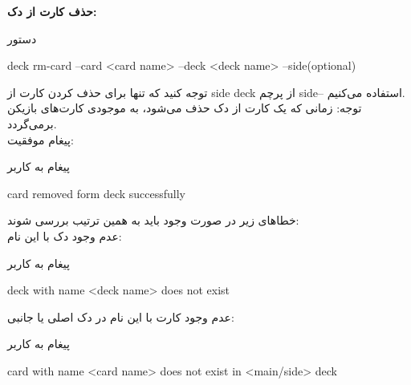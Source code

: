 \documentclass[]{article}
\begin{document}
\vspace{.5cm}
\textbf{حذف کارت از دک:}
\begin{mybox}[colback=yellow]{دستور}
	\begin{latin}	
		deck rm-card --card <card name> --deck <deck name> --side(optional)
	\end{latin}
\end{mybox}
توجه کنید که تنها برای حذف کردن کارت از side deck از پرچم side-- استفاده 
می‌کنیم.
\\
توجه: زمانی که یک کارت از دک حذف می‌شود، به موجودی کارت‌های بازیکن برمی‌گردد.
\\
پیغام موفقیت:
\begin{mybox}[colback=yellow]{پیغام به کاربر}
	\begin{latin}	
		card removed form deck successfully
	\end{latin}
\end{mybox}
خطاهای زیر در صورت وجود باید به همین ترتیب بررسی شوند:
\\
عدم وجود دک با این نام:
\begin{mybox}[colback=yellow]{پیغام به کاربر}
	\begin{latin}	
		deck with name <deck name> does not exist
	\end{latin}
\end{mybox}
عدم وجود کارت با این نام در دک اصلی یا جانبی:
\begin{mybox}[colback=yellow]{پیغام به کاربر}
	\begin{latin}	
		card with name <card name> does not exist in <main/side> deck
	\end{latin}
\end{mybox}
\end{document}
